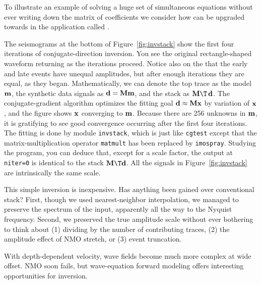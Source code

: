 To illustrate an example of solving a huge set of simultaneous
equations without ever writing down the matrix of coefficients
we consider how
{\it {}} can be upgraded towards
{\it {}} in the application called .
\par
The seismograms at the bottom of Figure~\ref{fig:invstack}
show the first four iterations of conjugate-direction inversion.
You see the original rectangle-shaped waveform returning
as the iterations proceed.
Notice also on the 
that the early and late events have unequal amplitudes,
but after enough iterations they are equal,
as they began.
Mathematically,
we can denote the top trace as the model $\bold m$,
the synthetic data signals as $\bold d = \bold M \bold m$,
and the stack as $\bold M\T\,\bold d$.
The conjugate-gradient algorithm optimizes the fitting goal
$\bold d \approx \bold M \bold x$ by variation of $\bold x$,
and the figure shows $\bold x$ converging to $\bold m$.
Because there are 256 unknowns in $\bold m$,
it is gratifying to see good convergence occurring
after the first four iterations.
The fitting is done by module {\tt invstack},
which is just like
\texttt{cgtest}  except that the matrix-multiplication operator
\texttt{matmult}  has been replaced by
\texttt{imospray}. %
Studying the program,
you can deduce that,
except for a scale factor,
the output at {\tt niter=0} is identical to the stack $\bold M\T \bold d$.
All the signals in Figure~\ref{fig:invstack} are intrinsically the same scale.%
\par
This simple inversion is inexpensive.
Has anything been gained over conventional stack?
First,
though we used nearest-neighbor interpolation,
we managed to preserve the spectrum of the input,
apparently all the way to the Nyquist frequency.
Second, we preserved the true amplitude scale
without ever bothering to think about
(1) dividing by the number of contributing traces,
(2) the amplitude effect of NMO stretch, or
(3) event truncation.
\par
With depth-dependent velocity,
wave fields become much more complex at wide offset.
NMO soon fails,
but wave-equation forward modeling
offers interesting opportunities for inversion.

